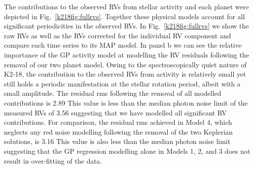 The contributions to the observed RVs from stellar activity and each planet were depicted in
Fig.~\ref{k218fig:fullrvs}. Together these physical models account for all significant periodicities in the
observed RVs. In Fig.~\ref{k218fig:fullrvs} we show the raw RVs as well as the RVs corrected for the individual RV
component and compare each time series to its MAP model. In panel b we can see the relative
importance of the GP activity model at modelling the RV residuals following the removal of our
two planet model. Owing to the spectroscopically quiet nature of K2-18, the contribution to the observed
RVs from activity is relatively small yet still holds a periodic manifestation at the stellar
rotation period, albeit with a small amplitude. 
The residual rms following the removal of all modelled contributions is 2.89
 This value is less than the median photon noise limit of the measured RVs of 3.56 \mps{} suggesting that
we have modelled all significant RV contributions. For comparison, the residual rms achieved in Model 4, which
neglects any red noise modelling following the removal of the two Keplerian solutions, is 3.16  This value is
also less than the median photon noise limit suggesting that the GP regression modelling alone in Models 1, 2, and
3 does not result in over-fitting of the data. \\

